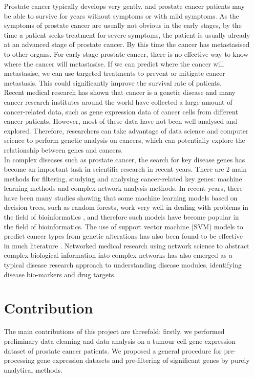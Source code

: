 \documentclass[12pt,a4paper]{report}
\begin{document}
Prostate cancer typically develops very gently, and prostate cancer patients may be able to survive for years without symptoms or with mild symptoms. As the symptoms of prostate cancer are usually not obvious in the early stages, by the time a patient seeks treatment for severe symptoms, the patient is usually already at an advanced stage of prostate cancer. By this time the cancer has metastasised to other organs. For early stage prostate cancer, there is no effective way to know where the cancer will metastasise. If we can predict where the cancer will metastasise, we can use targeted treatments to prevent or mitigate cancer metastasis. This could significantly improve the survival rate of patients.\\

Recent medical research has shown that cancer is a genetic disease \cite{Vog04} and many cancer research institutes around the world have collected a large amount of cancer-related data, such as gene expression data of cancer cells from different cancer patients. However, most of these data have not been well analysed and explored. Therefore, researchers can take advantage of data science and computer science to perform genetic analysis on cancers, which can potentially explore the relationship between genes and cancers.\\

In complex diseases such as prostate cancer, the search for key disease genes has become an important task in scientific research in recent years. There are 2 main methods for filtering, studying and analysing cancer-related key genes: machine learning methods and complex network analysis methods. In recent years, there have been many studies showing that some machine learning models based on decision trees, such as random forests, work very well in dealing with problems in the field of bioinformatics \cite{Car06}, and therefore such models have become popular in the field of bioinformatics. The use of support vector machine (SVM) \cite{Cor95} models to predict cancer types from genetic alterations has also been found to be effective in much literature \cite{Soh17} \cite{Ram01}. Networked medical research using network science to abstract complex biological information into complex networks has also emerged as a typical disease research approach to understanding disease modules, identifying disease bio-markers and drug targets\cite{Ire16}.\\



\section{Contribution}
The main contributions of this project are threefold: firstly, we performed preliminary data cleaning and data analysis on a tumour cell gene expression dataset of prostate cancer patients. We proposed a general procedure for pre-processing gene expression datasets and pre-filtering of significant genes by purely analytical methods.\\
\end{document}
